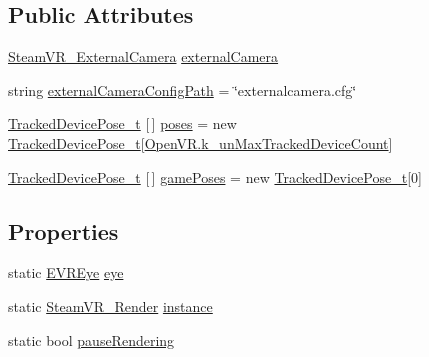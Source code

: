 \subsection*{Public Attributes}
\begin{DoxyCompactItemize}
\item 
\mbox{\hyperlink{class_valve_1_1_v_r_1_1_steam_v_r___external_camera}{Steam\+V\+R\+\_\+\+External\+Camera}} \mbox{\hyperlink{class_valve_1_1_v_r_1_1_steam_v_r___render_a301435a8700bd2f01ae860c3b89bac75}{external\+Camera}}
\item 
string \mbox{\hyperlink{class_valve_1_1_v_r_1_1_steam_v_r___render_afed0f382e294bc9455e6438fa8963b98}{external\+Camera\+Config\+Path}} = \char`\"{}externalcamera.\+cfg\char`\"{}
\item 
\mbox{\hyperlink{struct_valve_1_1_v_r_1_1_tracked_device_pose__t}{Tracked\+Device\+Pose\+\_\+t}} \mbox{[}$\,$\mbox{]} \mbox{\hyperlink{class_valve_1_1_v_r_1_1_steam_v_r___render_a38d4e5717b82b2be834d1876b2de0ac7}{poses}} = new \mbox{\hyperlink{struct_valve_1_1_v_r_1_1_tracked_device_pose__t}{Tracked\+Device\+Pose\+\_\+t}}\mbox{[}\mbox{\hyperlink{class_valve_1_1_v_r_1_1_open_v_r_aec52ee031bff706f1b96c7f2c8ebc0ac}{Open\+V\+R.\+k\+\_\+un\+Max\+Tracked\+Device\+Count}}\mbox{]}
\item 
\mbox{\hyperlink{struct_valve_1_1_v_r_1_1_tracked_device_pose__t}{Tracked\+Device\+Pose\+\_\+t}} \mbox{[}$\,$\mbox{]} \mbox{\hyperlink{class_valve_1_1_v_r_1_1_steam_v_r___render_a7c0cb20648b0e298cefe9ccd60ec3a27}{game\+Poses}} = new \mbox{\hyperlink{struct_valve_1_1_v_r_1_1_tracked_device_pose__t}{Tracked\+Device\+Pose\+\_\+t}}\mbox{[}0\mbox{]}
\end{DoxyCompactItemize}
\subsection*{Properties}
\begin{DoxyCompactItemize}
\item 
static \mbox{\hyperlink{namespace_valve_1_1_v_r_a8153d4a3e627e1cede046327087c1880}{E\+V\+R\+Eye}} \mbox{\hyperlink{class_valve_1_1_v_r_1_1_steam_v_r___render_a2cddcf3b055e3c6323ebc41586f78d2c}{eye}}
\item 
static \mbox{\hyperlink{class_valve_1_1_v_r_1_1_steam_v_r___render}{Steam\+V\+R\+\_\+\+Render}} \mbox{\hyperlink{class_valve_1_1_v_r_1_1_steam_v_r___render_afa00f388fb9bbd9a90773d319b079211}{instance}}
\item 
static bool \mbox{\hyperlink{class_valve_1_1_v_r_1_1_steam_v_r___render_ad0d6a11827b9c94df738a6e3669a0e70}{pause\+Rendering}}
\end{DoxyCompactItemize}


